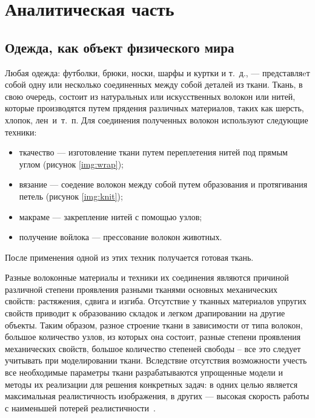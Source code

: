 \chapter{Аналитическая часть}

\section{Одежда, как объект физического мира}

Любая одежда: футболки, брюки, носки, шарфы и куртки и т.~д., --- представляeт
собой одну или несколько соединенных между собой деталей из ткани. Ткань, в свою
очередь, состоит из натуральных или искусственных волокон или нитей, которые
производятся путем прядения различных материалов, таких как шерсть, хлопок,
лен~и~т.~п. Для соединения полученных волокон используют следующие техники:
\begin{itemize}[left=\parindent]
    \item ткачество --- изготовление ткани путем переплетения нитей под прямым
        углом (рисунок \ref{img:wrap});
    \item вязание --- соедение волокон между собой путем образования и
        протягивания петель (рисунок \ref{img:knit});
    \item макраме --- закрепление нитей с помощью узлов;
    \item получение войлока --- прессование волокон животных.
\end{itemize}
После применения одной из этих техник получается готовая ткань.


Разные волоконные материалы и техники их соединения являются причиной различной
степени проявления разными тканями основных механических свойств: растяжения,
сдвига и изгиба. Отсутствие у тканных материалов упругих свойств приводит к
образованию складок и легком драпировании на другие объекты. Таким образом,
разное строение ткани в зависимости от типа волокон, большое количество узлов,
из которых она состоит, разные степени проявления механических свойств, большое
количество степеней свободы -- все это следует учитывать при моделировании
ткани. Вследствие отсутствия возможности учесть все необходимые параметры ткани
разрабатываются упрощенные модели и методы их реализации для решения конкретных
задач: в одних целью является максимальная реалистичность изображения, в других
--- высокая скорость работы с наименьшей потерей реалистичности~\cite{bib11}.

